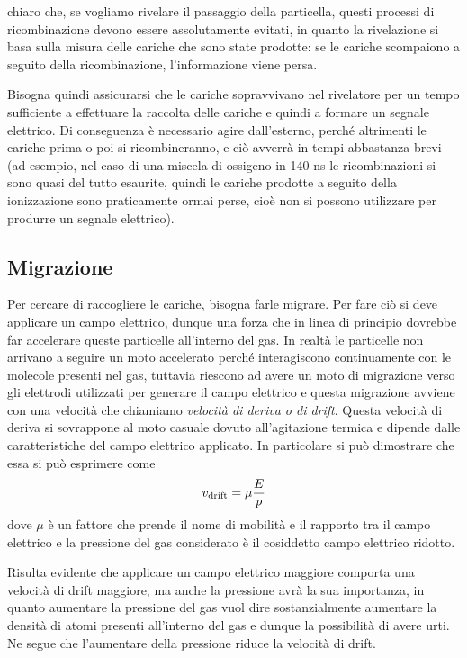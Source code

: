 \E chiaro che, se vogliamo rivelare il passaggio della particella, questi processi di ricombinazione devono essere assolutamente evitati, in quanto la rivelazione si basa sulla misura delle cariche che sono state prodotte: se le cariche scompaiono a seguito della ricombinazione, l'informazione viene persa.

Bisogna quindi assicurarsi che le cariche sopravvivano nel rivelatore per un tempo sufficiente a effettuare la raccolta delle cariche e quindi a formare un segnale elettrico. Di conseguenza è necessario agire dall'esterno, perché altrimenti le cariche prima o poi si ricombineranno, e ciò avverrà in tempi abbastanza brevi (ad esempio, nel caso di una miscela di ossigeno in 140 ns le ricombinazioni si sono quasi del tutto esaurite, quindi le cariche prodotte a seguito della ionizzazione sono praticamente ormai perse, cioè non si possono utilizzare per produrre un segnale elettrico). 

\subsection{Migrazione}
Per cercare di raccogliere le cariche, bisogna farle migrare. Per fare ciò si deve applicare un campo elettrico, dunque una forza che in linea di principio dovrebbe far accelerare queste particelle all'interno del gas. In realtà le particelle non arrivano a seguire un moto accelerato perché interagiscono continuamente con le molecole presenti nel gas, tuttavia riescono ad avere un moto di migrazione verso gli elettrodi utilizzati per generare il campo elettrico e questa migrazione avviene con una velocità che chiamiamo \textit{velocità di deriva o di drift}. Questa velocità di deriva si sovrappone al moto casuale dovuto all'agitazione termica e dipende dalle caratteristiche del campo elettrico applicato. In particolare si può dimostrare che essa si può esprimere come
\begin{equation*}
   v_{\rm drift}=\mu\frac{E}{p}
\end{equation*}
dove $\mu$ è un fattore che prende il nome di mobilità e il rapporto tra il campo elettrico e la pressione del gas considerato è il cosiddetto campo elettrico ridotto.

Risulta evidente che applicare un campo elettrico maggiore comporta una velocità di drift maggiore, ma anche la pressione avrà la sua importanza, in quanto aumentare la pressione del gas vuol dire sostanzialmente aumentare la densità di atomi presenti all'interno del gas e dunque la possibilità di avere urti. Ne segue che l'aumentare della pressione riduce la velocità di drift.


